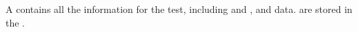 \item[\gdproject]{
A \gdproject contains all the information for the test, including \gdsuites{} and \gdcases{}, \gdauts{} and data.  \gdprojects are stored in the \gddb{}. 
}
